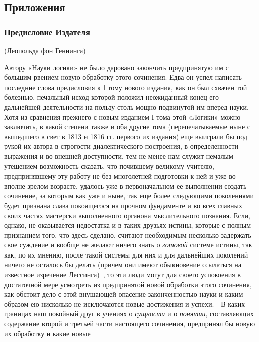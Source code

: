 \clearpage\subsection{Приложения}
\subsubsection[Предисловие Издателя
(94)]{Предисловие Издателя
\textstyleEndnodeLink{(\ref{bkm:Ref474669698}}\textstyleEndnodeLink{)}}
\label{bkm:bm94}{\centering
(Леопольда фон Геннинга)
\par}

Автору «Науки логики» не было даровано закончить предпринятую им с большим
рвением новую обработку этого сочинения. Едва он успел написать последние
слова предисловия к I тому нового издания, как он был схвачен той болезнью,
печальный исход которой положил неожиданный конец его дальнейшей
деятельности на пользу столь мощно подвинутой им вперед науки. Хотя из
сравнения прежнего с новым изданием I тома этой «Логики» можно заключить, в
какой степени также и оба другие тома (перепечатываемые ныне с вышедшего в
свет в 1813 и 1816 гг. первого их издания) еще выиграли бы под рукой их
автора в строгости диалектического построения, в определенности выражения и
во внешней доступности, тем не менее нам служит немалым утешением
возможность сказать, что почившему великому учителю, предпринявшему эту
работу не без многолетней подготовки к ней и уже во вполне зрелом возрасте,
удалось уже в первоначальном ее выполнении создать сочинение, за которым
как уже и ныне, так еще более следующими поколениями будет признана слава
покоящегося на прочном фундаменте и во всех главных своих частях мастерски
выполненного органона мыслительного познания. Если, однако, не оказывается
недостатка и в таких друзьях истины, которые с полным признанием того, что
здесь сделано, считают необходимым несколько задержать свое суждение и
вообще не желают ничего знать о {\em готовой} системе
истины, так как, по их мнению, после такой системы для них и для дальнейших
поколений ничего не осталось бы делать (причем они имеют обыкновение
ссылаться на известное изречение
Лессинга)~\label{bkm:Ref474655210},
то эти люди могут для своего успокоения в достаточной мере усмотреть из
предпринятой новой обработки этого сочинения, как обстоит дело с этой
внушающей опасение законченностью науки и каким образом ею нисколько не
исключаются новые достижения и успехи.—В каких границах наш покойный друг в
учениях о {\em сущности} и о
{\em понятии}, составляющих содержание второй и третьей
части настоящего сочинения, предпринял бы новую их обработку и какие новые
